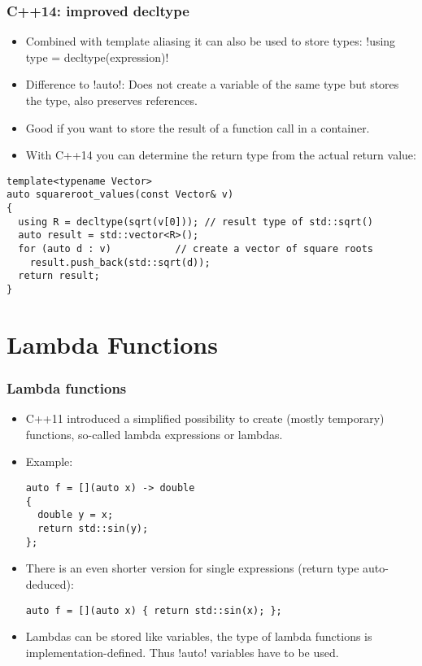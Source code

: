 \begin{frame}[fragile]
\frametitle{C++14: improved decltype}
\begin{itemize}
\item Combined with template aliasing it can also be used to store types:
\inline!using type = decltype(expression)! 
\item Difference to \inline!auto!: Does not create a variable of the same type but stores the type, also preserves references.
\item Good if you want to store the result of a function call in a container.
\item With C++14 you can determine the return type from the actual return value:
\end{itemize}
\begin{lstlisting}
template<typename Vector>
auto squareroot_values(const Vector& v)
{
  using R = decltype(sqrt(v[0])); // result type of std::sqrt()
  auto result = std::vector<R>();
  for (auto d : v)           // create a vector of square roots
    result.push_back(std::sqrt(d)); 
  return result;
}
\end{lstlisting}

\end{frame}


\section{Lambda Functions}

\begin{frame}[fragile]
  \frametitle<presentation>{Lambda functions}
  \begin{itemize}
  \item C++11 introduced a simplified possibility to create (mostly temporary) functions, so-called lambda expressions or lambdas.
  \item Example:
\begin{lstlisting}
auto f = [](auto x) -> double 
{
  double y = x;
  return std::sin(y);
};
\end{lstlisting}
\item There is an even shorter version for single expressions (return type auto-deduced):
\begin{lstlisting}
auto f = [](auto x) { return std::sin(x); };
\end{lstlisting}
\item Lambdas can be stored like variables, the type of lambda functions is implementation-defined. Thus \inline!auto! variables have to be used.
  \end{itemize}
\end{frame}


